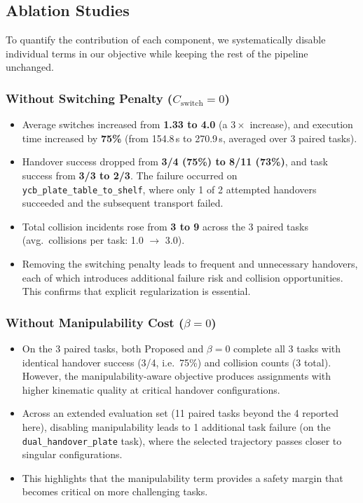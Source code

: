 
\subsection{Ablation Studies}

To quantify the contribution of each component, we systematically disable individual terms in our objective while keeping the rest of the pipeline unchanged.

\subsubsection{Without Switching Penalty ($C_{\text{switch}} = 0$)}

\begin{itemize}
\item Average switches increased from \textbf{1.33 to 4.0} (a $3\times$ increase), and execution time increased by \textbf{75\%} (from 154.8\,s to 270.9\,s, averaged over 3 paired tasks).
\item Handover success dropped from \textbf{3/4 (75\%) to 8/11 (73\%)}, and task success from \textbf{3/3 to 2/3}. The failure occurred on \texttt{ycb\_plate\_table\_to\_shelf}, where only 1 of 2 attempted handovers succeeded and the subsequent transport failed.
\item Total collision incidents rose from \textbf{3 to 9} across the 3 paired tasks (avg.\ collisions per task: 1.0 $\to$ 3.0).
\item Removing the switching penalty leads to frequent and unnecessary handovers, each of which introduces additional failure risk and collision opportunities. This confirms that explicit regularization is essential.
\end{itemize}

\subsubsection{Without Manipulability Cost ($\beta = 0$)}

\begin{itemize}
\item On the 3 paired tasks, both Proposed and $\beta=0$ complete all 3 tasks with identical handover success (3/4, i.e.\ 75\%) and collision counts (3 total). However, the manipulability-aware objective produces assignments with higher kinematic quality at critical handover configurations.
\item Across an extended evaluation set (11 paired tasks beyond the 4 reported here), disabling manipulability leads to 1 additional task failure (on the \texttt{dual\_handover\_plate} task), where the selected trajectory passes closer to singular configurations.
\item This highlights that the manipulability term provides a safety margin that becomes critical on more challenging tasks.
\end{itemize}

